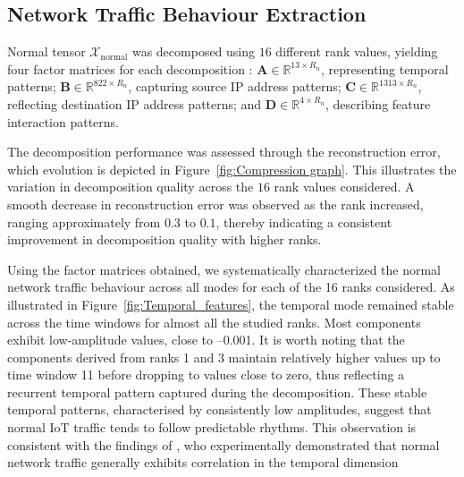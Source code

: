 \documentclass[preprint,12pt,authoryear]{elsarticle}
\begin{document}
\subsection{Network Traffic Behaviour Extraction}
Normal tensor $\mathcal{X}_{\text{normal}}$ was decomposed using $16$ different rank values, yielding four factor matrices for each decomposition : $\mathbf{A} \in \mathbb{R}^{13 \times R_n}$, representing temporal patterns; $\mathbf{B} \in \mathbb{R}^{822 \times R_n}$, capturing source IP address patterns; $\mathbf{C} \in \mathbb{R}^{1313 \times R_n}$, reflecting destination IP address patterns; and $\mathbf{D} \in \mathbb{R}^{4 \times R_n}$, describing feature interaction patterns. 

The decomposition performance was assessed through the reconstruction error, which evolution is depicted in Figure~\ref{fig:Compression graph}. This illustrates the variation in decomposition quality across the $16$ rank values considered. A smooth decrease in reconstruction error was observed as the rank increased, ranging approximately from $0.3$ to $0.1$, thereby indicating a consistent improvement in decomposition quality with higher ranks.

Using the factor matrices obtained, we systematically characterized the normal network traffic behaviour across all modes for each of the 16 ranks considered. As illustrated in Figure~\ref{fig:Temporal_features}, the temporal mode remained stable across the time windows for almost all the studied ranks. Most components exhibit low-amplitude values, close to –0.001. It is worth noting that the components derived from ranks 1 and 3 maintain relatively higher values up to time window 11 before dropping to values close to zero, thus reflecting a recurrent temporal pattern captured during the decomposition. These stable temporal patterns, characterised by consistently low amplitudes, suggest that normal IoT traffic tends to follow predictable rhythms. This observation is consistent with the findings of \cite{kun2016accurate}, who experimentally demonstrated that normal network traffic generally exhibits correlation in the temporal dimension
\end{document}
